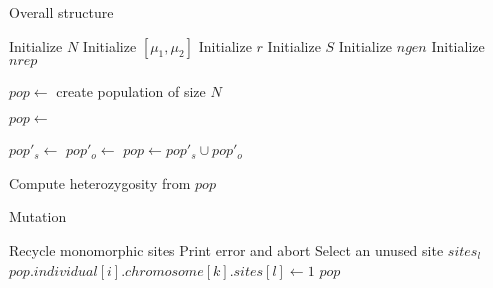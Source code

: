 \documentclass[12pt]{article}
\begin{document}
\begin{algorithm}
  \caption{Overall structure}
  \label{algo:overall}
  \begin{algorithmic}
    \State Initialize \(N\) 
    \State Initialize \([\mu_{1}, \mu_{2}]\) 
    \State Initialize \(r\) 
    \State Initialize \(S\) 
    \State Initialize \(ngen\) 
    \State Initialize \(nrep\) 


    \State \(pop \gets\) create population of size \(N\)


    \State \(pop \gets\) 

    \State \(pop'_{s} \gets\) 
    \State \(pop'_{o} \gets\) 
    \State \(pop \gets pop'_{s} \cup pop'_{o}\)
    \EndFor

    \State Compute heterozygosity from \(pop\)

    \EndFor

  \end{algorithmic}
\end{algorithm}

\begin{algorithm}
  \caption{Mutation}
  \label{algo:mutation}
  \begin{algorithmic}
     
     
    \State Recycle monomorphic sites
    \State Print error and abort
    \EndIf
    \EndIf
    \State Select an unused site \(sites_{l}\)
    \State \(pop.individual[i].chromosome[k].sites[l] \gets 1\)
    \EndIf
    \EndFor
    \EndFor
    \EndFor
    \State \Return \(pop\)
    \EndFunction
  \end{algorithmic}
\end{algorithm}
\end{document}

